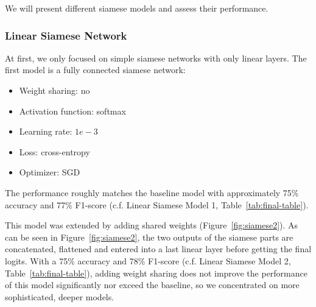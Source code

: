 \documentclass[10pt,conference,compsocconf]{IEEEtran}
\begin{document}
We will present different siamese models and assess their performance.\newline

\subsubsection{Linear Siamese Network}\label{subsubsec:siamese-models}
At first, we only focused on simple siamese networks with only linear layers.
The first model is a fully connected siamese network: 
\begin{itemize}
    \item Weight sharing: no 
    \item Activation function: softmax \item Learning rate: $1e-3$
    \item Loss: cross-entropy
    \item Optimizer: SGD
\end{itemize}
The performance roughly matches the baseline model with approximately 75\% accuracy and 77\% F1-score (c.f. Linear Siamese Model 1, Table~\ref{tab:final-table}). 


This model was extended by adding shared weights (Figure~\ref{fig:siamese2}). As can be seen in Figure~\ref{fig:siamese2}, the two outputs of the siamese parts are concatenated, flattened and entered into a last linear layer before getting the final logits. With a 75\% accuracy and 78\% F1-score (c.f. Linear Siamese Model 2, Table~\ref{tab:final-table}), adding weight sharing does not improve the performance of this model significantly nor exceed the baseline, so we concentrated on more sophisticated, deeper models.
\end{document}
